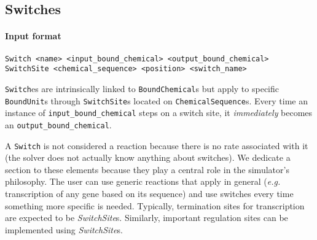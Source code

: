 
\subsection{Switches}

\paragraph{Input format}
\begin{verbatim}
Switch <name> <input_bound_chemical> <output_bound_chemical>
SwitchSite <chemical_sequence> <position> <switch_name>
\end{verbatim}

\texttt{Switch}es are intrinsically linked to \texttt{BoundChemical}s but apply to specific \texttt{BoundUnit}s through \texttt{SwitchSite}s located on \texttt{ChemicalSequence}s. Every time an instance of \texttt{input\_bound\_chemical} steps on a switch site, it \emph{immediately} becomes an \texttt{output\_bound\_chemical}.

A \texttt{Switch} is not considered a reaction because there is no rate associated with it (the solver does not actually know anything about switches). We dedicate a section to these elements because they play a central role in the simulator's philosophy. The user can use generic reactions that apply in general (\textit{e.g.} transcription of any gene based on its sequence) and use switches every time something more specific is needed. Typically, termination sites for transcription are expected to be \textit{SwitchSite}s. Similarly, important regulation sites can be implemented using \textit{SwitchSite}s.

